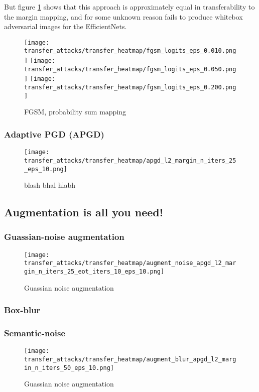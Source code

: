 But figure \ref{fig:fgsm_prob_sum} shows that this approach is approximately equal in transferability to the margin mapping, and for some unknown reason fails to produce whitebox adversarial images for the EfficientNets.

\begin{figure}[!htb]
  \texttt{[image: transfer\_attacks/transfer\_heatmap/fgsm\_logits\_eps\_0.010.png]}
\endminipage\hfill
{}
  \texttt{[image: transfer\_attacks/transfer\_heatmap/fgsm\_logits\_eps\_0.050.png]}
\endminipage\hfill
{}%
  \texttt{[image: transfer\_attacks/transfer\_heatmap/fgsm\_logits\_eps\_0.200.png]}
\endminipage
\caption{FGSM, probability sum mapping}
\label{fig:fgsm_prob_sum}
\end{figure}





\subsubsection{Adaptive PGD (APGD)}
\begin{figure}[h]
    \centering
    \texttt{[image: transfer\_attacks/transfer\_heatmap/apgd\_l2\_margin\_n\_iters\_25\_eps\_10.png]}
    \caption{blash bhal hlabh}
    \label{fig:apgd_margin}
\end{figure}

\subsection{Augmentation is all you need!}
\subsubsection{Guassian-noise augmentation}
\begin{figure}[h]
    \centering
    \texttt{[image: transfer\_attacks/transfer\_heatmap/augment\_noise\_apgd\_l2\_margin\_n\_iters\_25\_eot\_iters\_10\_eps\_10.png]}
    \caption{Guassian noise augmentation}
    \label{fig:noise_augment}
\end{figure}



\subsubsection{Box-blur}
\subsubsection{Semantic-noise}
\begin{figure}[h]
    \centering
    \texttt{[image: transfer\_attacks/transfer\_heatmap/augment\_blur\_apgd\_l2\_margin\_n\_iters\_50\_eps\_10.png]}
    \caption{Guassian noise augmentation}
    \label{fig:fox_blur}
\end{figure}


